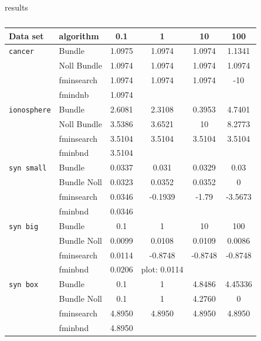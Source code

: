 results

\begin{center}
\begin{table}[H]%
	\begin{tabular}{llcccc}
		\hline
    Data set & algorithm & 0.1 & 1 & 10 & 100 \\
		\hline
		\texttt{cancer} & Bundle & 1.0975 & 1.0974 & 1.0974 & 1.1341 \\
		 & Noll Bundle & 1.0974 & 1.0974 & 1.0974 & 1.0974 \\
		 &  fminsearch & 1.0974 & 1.0974 & 1.0974 & -10 \\
		 & fmindnb & 1.0974 \\
		\texttt{ionosphere} & Bundle & 2.6081 & 2.3108 & 0.3953 & 4.7401 \\
		 & Noll Bundle & 3.5386 & 3.6521 & 10 & 8.2773 \\
		 & fminsearch & 3.5104 & 3.5104 & 3.5104 & 3.5104 \\
		 & fminbnd & 3.5104 \\
		\texttt{syn small} & Bundle & 0.0337 & 0.031 & 0.0329& 0.03 \\
		 & Bundle Noll & 0.0323 & 0.0352 & 0.0352 & 0 \\
		 & fminsearch & 0.0346 & -0.1939 & -1.79 & -3.5673 \\
		 & fminbnd & 0.0346 \\
		\texttt{syn big} & Bundle & 0.1 & 1 & 10 & 100 \\
		 & Bundle Noll & 0.0099 & 0.0108 & 0.0109 & 0.0086 \\
		 & fminsearch & 0.0114 & -0.8748 & -0.8748 & -0.8748 \\
		 & fminbnd & 0.0206 & plot: 0.0114\\
		\texttt{syn box} & Bundle & 0.1 & 1 & 4.8486 & 4.45336 \\
		 & Bundle Noll & 0.1 & 1 & 4.2760 & 0 \\
		 & fminsearch & 4.8950 & 4.8950 & 4.8950 & 4.8950 \\
		 & fminbnd & 4.8950 \\
	\end{tabular}
	\caption{}
\end{table}
\end{center}

